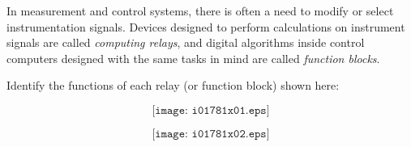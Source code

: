 

In measurement and control systems, there is often a need to modify or select instrumentation signals.  Devices designed to perform calculations on instrument signals are called {\it computing relays}, and digital algorithms inside control computers designed with the same tasks in mind are called {\it function blocks}.

Identify the functions of each relay (or function block) shown here:

$$\texttt{[image: i01781x01.eps]}$$







$$\texttt{[image: i01781x02.eps]}$$











